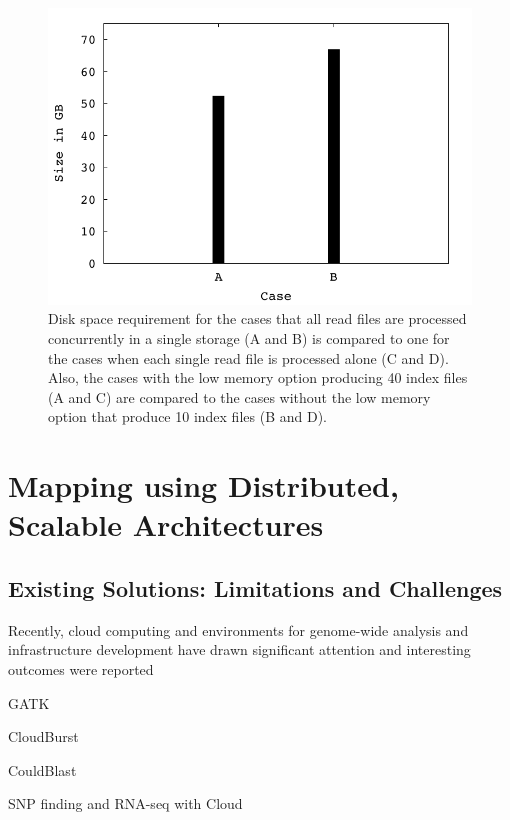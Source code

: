 \documentclass{acm_proc_article-sp}
\begin{document}
\begin{figure}
 \centering
\includegraphics[scale=0.66]{figures/diskspace.pdf}
\caption{\small Disk space requirement for the cases that all read
  files are processed concurrently in a single storage (A and B) is
  compared to one for the cases when each single read file is
  processed alone (C and D).  Also, the cases with the low memory
  option producing 40 index files (A and C) are compared to the cases
  without the low memory option that produce 10 index files (B and
  D). }
  \label{fig:diskspace} 
 \end{figure}


\section{Mapping using Distributed, Scalable Architectures}

\subsection{Existing Solutions: Limitations and Challenges}


Recently, cloud computing and environments for genome-wide analysis
and infrastructure development have drawn significant attention and
interesting outcomes were reported\cite{taylor2010,cloudburst,
  cloudblast, langmead2009, langmead2010,gatk, halligan2009}

\begin{itemize*}
\item GATK\cite{gatk}
\item CloudBurst\cite{cloudburst}
\item CouldBlast\cite{cloudblast}
\item SNP finding and RNA-seq with Cloud\cite{langmead2009, langmead2010}
\end{itemize*}
\end{document}
